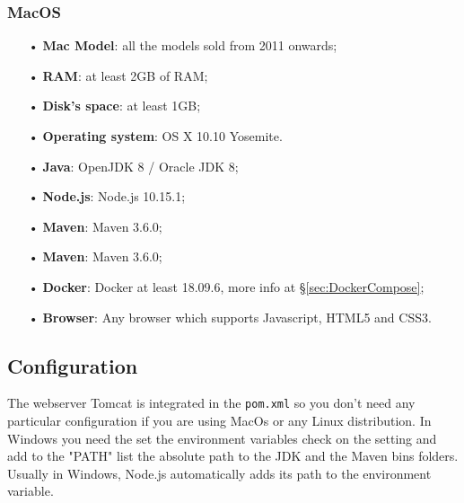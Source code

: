 \subsubsection{MacOS}
\begin{itemize}
\item [•]\textbf{Mac Model}: all the models sold from 2011 onwards;
\item [•]\textbf{RAM}: at least 2GB of RAM;
\item [•]\textbf{Disk’s space}: at least 1GB;
\item [•]\textbf{Operating system}: OS X 10.10 Yosemite.
\item [•]\textbf{Java}: OpenJDK 8 / Oracle JDK 8;
\item [•]\textbf{Node.js}: Node.js 10.15.1;
\item [•]\textbf{Maven}: Maven 3.6.0;
\item [•]\textbf{Maven}: Maven 3.6.0;
\item [•]\textbf{Docker}: Docker at least 18.09.6, more info at §\ref{sec:DockerCompose};  
\item [•]\textbf{Browser}: Any browser which supports Javascript, HTML5 and CSS3.
\end{itemize}

\subsection{Configuration}
The webserver Tomcat is integrated in the \texttt{pom.xml} so you don't need any particular configuration if you are using MacOs or any Linux distribution.
In Windows you need the set the environment variables check on the setting and add to the "PATH" list the absolute path to the JDK and the Maven bins folders.
Usually in Windows, Node.js automatically adds its path to the environment variable.
